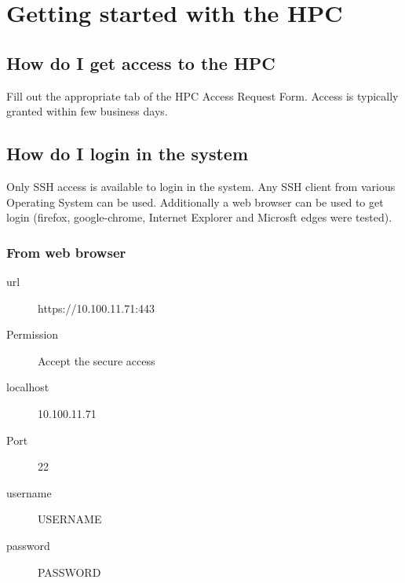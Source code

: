 \documentclass[11pt]{article}
\numberwithin{figure}{section}
\newcommand\CC{\Lang{\mbox{C++}}\xspace}
\newcommand\Lang[1]{\textsc{#1}}
\begin{document}
\maketitle


\section{Getting started with the HPC}

\subsection{How do I get access to the HPC}
Fill out the appropriate tab of the HPC Access Request Form. Access is
typically granted within few business days.

\subsection{How do I login in the system}
Only SSH access is available to login in the system. Any SSH client from
various Operating System can be used. Additionally a web browser can be used to
get login (firefox, google-chrome, Internet Explorer and Microsft edges were
tested).

\subsubsection{From web browser}

\begin{description}
    \item[url] https://10.100.11.71:443
    \item[Permission] Accept the secure access
    \item[localhost] 10.100.11.71
    \item[Port] 22
    \item[username] USERNAME
    \item[password] PASSWORD
\end{description}
\end{document}
